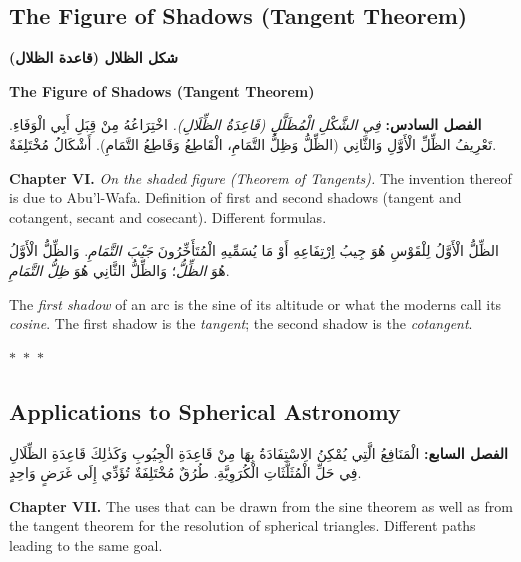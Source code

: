 \documentclass[11pt,a4paper]{article}
\theoremstyle{plain}
\theoremstyle{definition}
\theoremstyle{remark}
\newcommand{\ar}[1]{{\arabicfont\beginR #1\endR}}
\newcommand{\bilingualpair}[2]{%
  \par\noindent
  \begin{minipage}[t]{0.48\textwidth}
  #1
  \end{minipage}%
  \hfill
  \begin{minipage}[t]{0.48\textwidth}
  \vspace*{0pt}#2
  \end{minipage}\par\vspace{0.3cm}%
}
\newcommand{\ornament}{\begin{center}\textcolor{goldaccent}{$\ast$~$\ast$~$\ast$}\end{center}}
\begin{document}
\vspace{0.5cm}

\subsection{The Figure of Shadows (Tangent Theorem)}
\label{sec:shadows}

\bilingualpair{\noindent\textcolor{arabicblue}{\textbf{\ar{شكل الظلال (قاعدة الظلال)}}}}{\noindent\textcolor{sectioncolor}{\textbf{The Figure of Shadows (Tangent Theorem)}}}

\vspace{0.3cm}

\bilingualpair{\ar{\textbf{الفصل السادس:} \textit{فِي الشَّكْلِ الْمُظَلَّلِ (قَاعِدَةُ الظِّلَالِ).} اخْتِرَاعُهُ مِنْ قِبَلِ أَبِي الْوَفَاءِ. تَعْرِيفُ الظِّلِّ الْأَوَّلِ وَالثَّانِي (الظِّلُّ وَظِلُّ التَّمَامِ، الْقَاطِعُ وَقَاطِعُ التَّمَامِ). أَشْكَالُ مُخْتَلِفَةٌ.}}{\noindent\textbf{Chapter VI.} \textit{On the shaded figure (Theorem of Tangents).} The invention thereof is due to Abu'l-Wafa. Definition of first and second shadows (tangent and cotangent, secant and cosecant). Different formulas.}

\vspace{0.3cm}

\bilingualpair{\ar{الظِّلُّ الْأَوَّلُ لِلْقَوْسِ هُوَ جِيبُ اِرْتِفَاعِهِ أَوْ مَا يُسَمِّيهِ الْمُتَأَخِّرُونَ \textit{جَيْبَ التَّمَامِ}. وَالظِّلُّ الْأَوَّلُ هُوَ \textit{الظِّلُّ}؛ وَالظِّلُّ الثَّانِي هُوَ \textit{ظِلُّ التَّمَامِ}.}}{The \textit{first shadow} of an arc is the sine of its altitude or what the moderns call its \textit{cosine}. The first shadow is the \textit{tangent}; the second shadow is the \textit{cotangent}.}

\ornament

\subsection{Applications to Spherical Astronomy}
\label{sec:applications}

\bilingualpair{\ar{\textbf{الفصل السابع:} الْمَنَافِعُ الَّتِي يُمْكِنُ الِاسْتِفَادَةُ بِهَا مِنْ قَاعِدَةِ الْجِيُوبِ وَكَذٰلِكَ قَاعِدَةِ الظِّلَالِ فِي حَلِّ الْمُثَلَّثَاتِ الْكُرَوِيَّةِ. طُرُقٌ مُخْتَلِفَةٌ تُؤَدِّي إِلَى غَرَضٍ وَاحِدٍ.}}{\noindent\textbf{Chapter VII.} The uses that can be drawn from the sine theorem as well as from the tangent theorem for the resolution of spherical triangles. Different paths leading to the same goal.}
\end{document}
